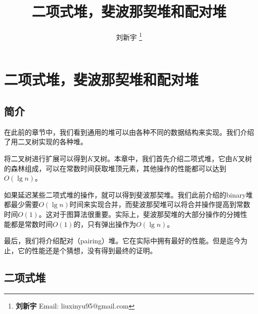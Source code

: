 \documentclass{ctexart}
\begin{document}


\title{二项式堆，斐波那契堆和配对堆}

\author{刘新宇
\thanks{{\bfseries 刘新宇 } \newline
  Email: liuxinyu95@gmail.com \newline}
  }

\maketitle
\fi


\ifx\wholebook\relax
\chapter{二项式堆，斐波那契堆和配对堆}
\fi

\section{简介}
\label{introduction}

在此前的章节中，我们看到通用的堆可以由各种不同的数据结构来实现。我们介绍了用二叉树实现的各种堆。

将二叉树进行扩展可以得到$K$叉树\cite{K-ary-tree}。本章中，我们首先介绍二项式堆，它由$K$叉树的森林组成，可以在常数时间获取堆顶元素，其他操作的性能都可以达到$O(\lg n)$。

如果延迟某些二项式堆的操作，就可以得到斐波那契堆。我们此前介绍的binary堆都最少需要$O(\lg n)$时间来实现合并，而斐波那契堆可以将合并操作提高到常数时间$O(1)$。这对于图算法很重要。实际上，斐波那契堆的大部分操作的分摊性能都是常数时间$O(1)$的，只有弹出操作为$O(\lg n)$。

最后，我们将介绍配对（pairing）堆。它在实际中拥有最好的性能。但是迄今为止，它的性能还是个猜想，没有得到最终的证明。


\section{二项式堆}
\label{sec:binomial-heap} 
\end{document}
